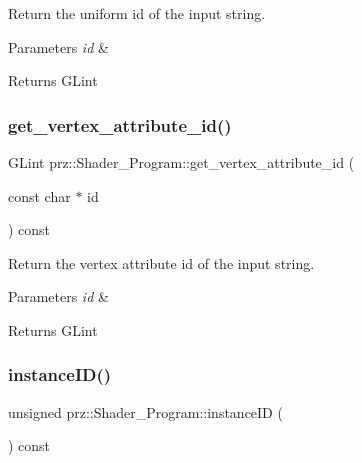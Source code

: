 Return the uniform id of the input string. 


\begin{DoxyParams}{Parameters}
{\em id} & \\
\hline
\end{DoxyParams}
\begin{DoxyReturn}{Returns}
G\+Lint 
\end{DoxyReturn}
\mbox{\label{classprz_1_1_shader___program_a10cfe69aaa44702980a02bb188f690b1}} 
\subsubsection{\texorpdfstring{get\_vertex\_attribute\_id()}{get\_vertex\_attribute\_id()}}
{\footnotesize\ttfamily G\+Lint prz\+::\+Shader\+\_\+\+Program\+::get\+\_\+vertex\+\_\+attribute\+\_\+id (\begin{DoxyParamCaption}\item[{const char $\ast$}]{id }\end{DoxyParamCaption}) const\hspace{0.3cm}{\ttfamily [inline]}}



Return the vertex attribute id of the input string. 


\begin{DoxyParams}{Parameters}
{\em id} & \\
\hline
\end{DoxyParams}
\begin{DoxyReturn}{Returns}
G\+Lint 
\end{DoxyReturn}
\mbox{\label{classprz_1_1_shader___program_a55bb714a5fb1c02b5425290ed0f38333}} 
\subsubsection{\texorpdfstring{instanceID()}{instanceID()}}
{\footnotesize\ttfamily unsigned prz\+::\+Shader\+\_\+\+Program\+::instance\+ID (\begin{DoxyParamCaption}{ }\end{DoxyParamCaption}) const\hspace{0.3cm}{\ttfamily [inline]}}



